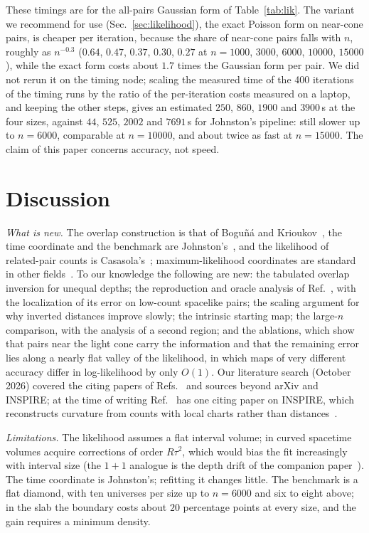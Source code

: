 \documentclass[prd,twocolumn,superscriptaddress,nofootinbib,amsmath,amssymb,floatfix]{revtex4-2}
\begin{document}
These timings are for the all-pairs Gaussian form of Table~\ref{tab:lik}. The variant we recommend for use (Sec.~\ref{sec:likelihood}), the exact Poisson form on near-cone pairs, is cheaper per iteration, because the share of near-cone pairs falls with $n$, roughly as $n^{-0.3}$ ($0.64$, $0.47$, $0.37$, $0.30$, $0.27$ at $n=1000$, $3000$, $6000$, $10000$, $15000$), while the exact form costs about $1.7$ times the Gaussian form per pair. We did not rerun it on the timing node; scaling the measured time of the 400 iterations of the timing runs by the ratio of the per-iteration costs measured on a laptop, and keeping the other steps, gives an estimated $250$, $860$, $1900$ and $3900$\,s at the four sizes, against $44$, $525$, $2002$ and $7691$\,s for Johnston's pipeline: still slower up to $n=6000$, comparable at $n=10000$, and about twice as fast at $n=15000$. The claim of this paper concerns accuracy, not speed.

\section{Discussion}\label{sec:disc}
\emph{What is new.} The overlap construction is that of Bogu\~n\'a and Krioukov~\cite{BK24}, the time coordinate and the benchmark are Johnston's~\cite{Johnston25}, and the likelihood of related-pair counts is Casasola's~\cite{Casasola26}; maximum-likelihood coordinates are standard in other fields~\cite{Ramsay77,Hoff02,BPK10,Mercator19,Sim21}. To our knowledge the following are new: the tabulated overlap inversion for unequal depths; the reproduction and oracle analysis of Ref.~\cite{Johnston25}, with the localization of its error on low-count spacelike pairs; the scaling argument for why inverted distances improve slowly; the intrinsic starting map; the large-$n$ comparison, with the analysis of a second region; and the ablations, which show that pairs near the light cone carry the information and that the remaining error lies along a nearly flat valley of the likelihood, in which maps of very different accuracy differ in log-likelihood by only $O(1)$. Our literature search (October 2026) covered the citing papers of Refs.~\cite{BK24,Johnston25,CloughEvans16,Casasola26} and sources beyond arXiv and INSPIRE; at the time of writing Ref.~\cite{Johnston25} has one citing paper on INSPIRE, which reconstructs curvature from counts with local charts rather than distances~\cite{Madsen26}.

\emph{Limitations.} The likelihood assumes a flat interval volume; in curved spacetime volumes acquire corrections of order $R\tau^2$, which would bias the fit increasingly with interval size (the $1+1$ analogue is the depth drift of the companion paper~\cite{Toolkit}). The time coordinate is Johnston's; refitting it changes little. The benchmark is a flat diamond, with ten universes per size up to $n=6000$ and six to eight above; in the slab the boundary costs about $20$ percentage points at every size, and the gain requires a minimum density.
\end{document}
